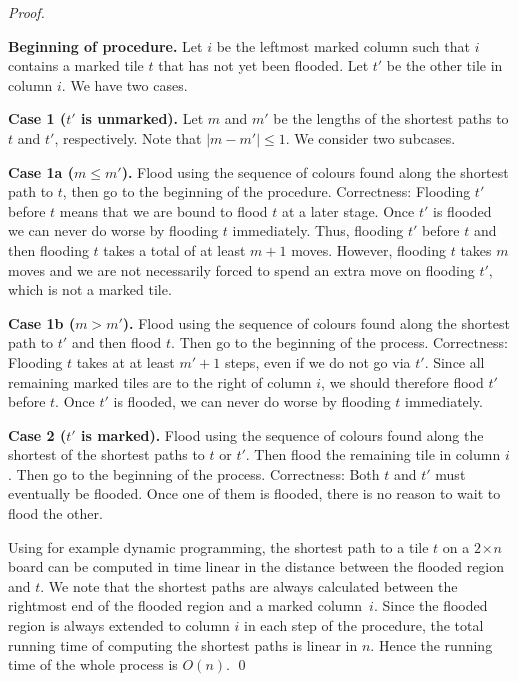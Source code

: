 \documentclass[a4paper,11pt]{llncs}
\newcounter{l}
\renewcommand{\leq}{\leqslant}
\newcommand{\recdim}[2]{$#1$$\mspace{1mu}$$\times$$\mspace{1mu}$$#2$}
\begin{document}
\begin{proof}
    \begin{description}
        \item{\bf Beginning of procedure.} Let $i$ be the leftmost marked column such that $i$ contains a marked tile $t$ that has not yet been flooded. Let $t'$ be the other tile in column $i$. We have two cases.
\begin{description}
                \item{\bf Case 1 ($t'$ is unmarked).} Let $m$ and $m'$ be the lengths of the shortest paths to $t$ and $t'$, respectively. Note that $|m-m'|\leq 1$. We consider two subcases.
\begin{description}
                        \item{\bf Case 1a ($m\leq m'$).} Flood using the sequence of colours found along the shortest path to $t$, then go to the beginning of the procedure. Correctness: Flooding $t'$ before $t$ means that we are bound to flood $t$ at a later stage. Once $t'$ is flooded we can never do worse by flooding $t$ immediately. Thus, flooding $t'$ before $t$ and then flooding $t$ takes a total of at least $m+1$ moves. However, flooding $t$ takes $m$ moves and we are not necessarily forced to spend an extra move on flooding $t'$, which is not a marked tile.
                        \item{\bf Case 1b ($m>m'$).}  Flood using the sequence of colours found along the shortest path to $t'$ and then flood $t$. Then go to the beginning of the process. Correctness: Flooding $t$ takes at at least $m'+1$ steps, even if we do not go via $t'$. Since all remaining marked tiles are to the right of column $i$, we should therefore flood $t'$ before $t$. Once $t'$ is flooded, we can never do worse by flooding $t$ immediately.
\end{description}
\item{\bf Case 2 ($t'$ is marked).} Flood using the sequence of colours found along the shortest of the shortest paths to $t$ or $t'$. Then flood the remaining tile in column $i$. Then go to the beginning of the process. Correctness: Both $t$ and $t'$ must eventually be flooded. Once one of them is flooded, there is no reason to wait to flood the other.
            \end{description}
    \end{description}

    Using for example dynamic programming, the shortest path to a tile $t$ on a \recdim{2}{n} board can be computed in time linear in the distance between the flooded region and $t$. We note that the shortest paths are always calculated between the rightmost end of the flooded region and a marked column~$i$. Since the flooded region is always extended to column $i$ in each step of the procedure, the total running time of computing the shortest paths is linear in $n$. Hence the running time of the whole process is $O(n)$. \qed
\end{proof}
\end{document}
